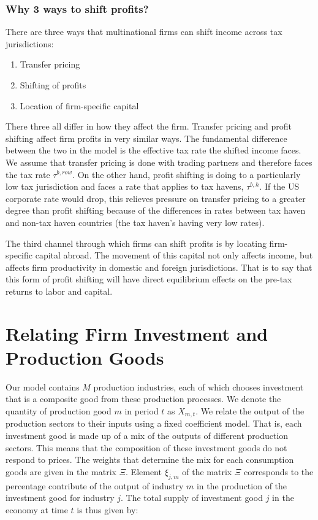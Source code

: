 \subsubsection{Why 3 ways to shift profits?}

There are three ways that multinational firms can shift income across tax jurisdictions:
\begin{enumerate}
\item Transfer pricing
\item Shifting of profits
\item Location of firm-specific capital
\end{enumerate}

There three all differ in how they affect the firm.  Transfer pricing and profit shifting affect firm profits in very similar ways.  The fundamental difference between the two in the model is the effective tax rate the shifted income faces.  We assume that transfer pricing is done with trading partners and therefore faces the tax rate $\tau^{b,row}$.  On the other hand, profit shifting is doing to a particularly low tax jurisdiction and faces a rate that applies to tax havens, $\tau^{b,h}$.  If the US corporate rate would drop, this relieves pressure on transfer pricing to a greater degree than profit shifting because of the differences in rates between tax haven and non-tax haven countries (the tax haven's having very low rates).

The third channel through which firms can shift profits is by locating firm-specific capital abroad.  The movement of this capital not only affects income, but affects firm productivity in domestic and foreign jurisdictions.  That is to say that this form of profit shifting will have direct equilibrium effects on the pre-tax returns to labor and capital.  


    \section{Relating Firm Investment and Production Goods}\label{sec:prod_invest_map}
    
    Our model contains $M$ production industries, each of which chooses investment that is a composite good from these production processes.  We denote the quantity of production good $m$ in period $t$ as $X_{m,t}$.  We relate the output of the production sectors to their inputs using a fixed coefficient model. That is, each investment good is made up of a mix of the outputs of different production sectors.  This means that the composition of these investment goods do not respond to prices.  The weights that determine the mix for each consumption goods are given in the matrix $\Xi$.  Element $\xi_{j,m}$ of the matrix $\Xi$ corresponds to the percentage contribute of the output of industry $m$ in the production of the investment good for industry $j$.  The total supply of investment good $j$ in the economy at time $t$ is thus given by: 
    
